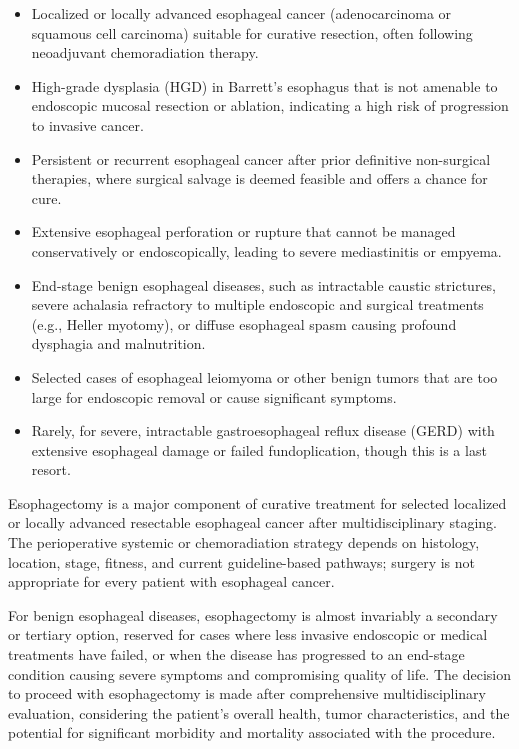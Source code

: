 \begin{itemize}
  \item Localized or locally advanced esophageal cancer (adenocarcinoma or squamous cell carcinoma) suitable for curative resection, often following neoadjuvant chemoradiation therapy.
  \item High-grade dysplasia (HGD) in Barrett's esophagus that is not amenable to endoscopic mucosal resection or ablation, indicating a high risk of progression to invasive cancer.
  \item Persistent or recurrent esophageal cancer after prior definitive non-surgical therapies, where surgical salvage is deemed feasible and offers a chance for cure.
  \item Extensive esophageal perforation or rupture that cannot be managed conservatively or endoscopically, leading to severe mediastinitis or empyema.
  \item End-stage benign esophageal diseases, such as intractable caustic strictures, severe achalasia refractory to multiple endoscopic and surgical treatments (e.g., Heller myotomy), or diffuse esophageal spasm causing profound dysphagia and malnutrition.
  \item Selected cases of esophageal leiomyoma or other benign tumors that are too large for endoscopic removal or cause significant symptoms.
  \item Rarely, for severe, intractable gastroesophageal reflux disease (GERD) with extensive esophageal damage or failed fundoplication, though this is a last resort.
\end{itemize}

Esophagectomy is a major component of curative treatment for selected localized or locally advanced resectable esophageal cancer after multidisciplinary staging. The perioperative systemic or chemoradiation strategy depends on histology, location, stage, fitness, and current guideline-based pathways; surgery is not appropriate for every patient with esophageal cancer.

For benign esophageal diseases, esophagectomy is almost invariably a secondary or tertiary option, reserved for cases where less invasive endoscopic or medical treatments have failed, or when the disease has progressed to an end-stage condition causing severe symptoms and compromising quality of life. The decision to proceed with esophagectomy is made after comprehensive multidisciplinary evaluation, considering the patient's overall health, tumor characteristics, and the potential for significant morbidity and mortality associated with the procedure.

